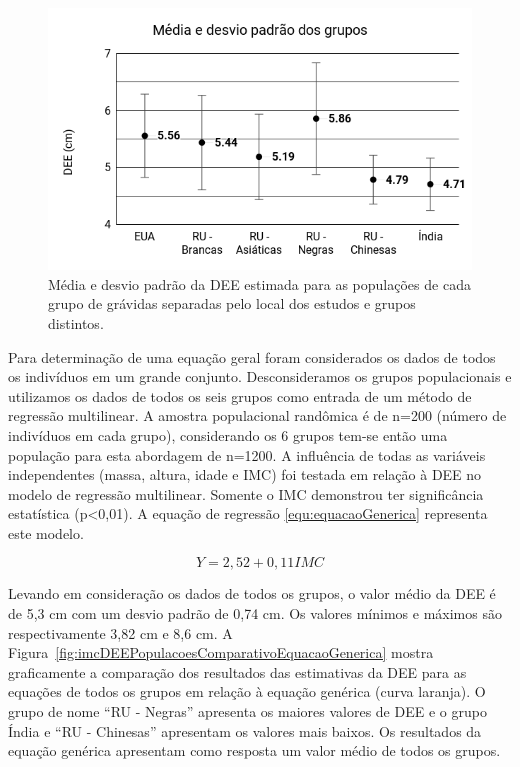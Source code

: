 \begin{figure}[ht!]
    \centering
    \includegraphics[width=0.8\linewidth]{capitulos/figuras/Media e desvio padrao dos grupos.png} 
    \caption{Média e desvio padrão da \acrshort{DEE} estimada para as populações de cada grupo de grávidas separadas pelo local dos estudos e grupos distintos.}
    \label{fig:mediaDesvioPadraoPopulacoes}
\end{figure}

Para determinação de uma equação geral foram considerados os dados de todos os indivíduos em um grande conjunto. Desconsideramos os grupos populacionais e utilizamos os dados de todos os seis grupos como entrada de um método de regressão multilinear. A amostra populacional randômica é de n=200 (número de indivíduos em cada grupo), considerando os 6 grupos tem-se então uma população para esta abordagem de n=1200. A influência de todas as variáveis  independentes (massa, altura, idade e \acrshort{IMC}) foi testada em relação à \acrshort{DEE} no modelo de regressão multilinear. Somente o \acrshort{IMC} demonstrou ter significância estatística (p<0,01). A equação de regressão \ref{equ:equacaoGenerica} representa este modelo. 

\begin{equation}
\label{equ:equacaoGenerica}
Y=2,52+0,11 IMC
\end{equation}

Levando em consideração os dados de todos os grupos, o valor médio da \acrshort{DEE} é de 5,3 cm com um desvio padrão de 0,74 cm. Os valores mínimos e máximos são respectivamente 3,82 cm e 8,6 cm. A Figura~\ref{fig:imcDEEPopulacoesComparativoEquacaoGenerica} mostra graficamente a comparação dos resultados das estimativas da  \acrshort{DEE} para as equações de todos os grupos em relação à equação genérica (curva laranja). O grupo de nome ``RU - Negras'' apresenta os maiores valores de \acrshort{DEE} e o grupo Índia e ``RU - Chinesas'' apresentam os valores mais baixos. Os resultados da equação genérica apresentam como resposta um valor médio de todos os grupos.

